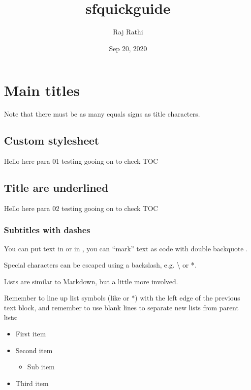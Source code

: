 \documentclass[letterpaper,10pt,english]{sphinxmanual}
\title{sfquickguide}
\date{Sep 20, 2020}
\author{Raj Rathi}
\begin{document}
\pagestyle{empty}
\sphinxmaketitle
\pagestyle{plain}
\sphinxtableofcontents
\pagestyle{normal}
\label{\detokenize{index::doc}}



\chapter{Main titles}
\label{\detokenize{in_file:main-titles}}\label{\detokenize{in_file::doc}}
Note that there must be as many equals signs as title characters.


\section{Custom stylesheet}
\label{\detokenize{in_file:custom-stylesheet}}\label{\detokenize{in_file:id1}}
Hello here para 01 testing gooing on to check TOC


\section{Title are underlined}
\label{\detokenize{in_file:title-are-underlined}}
Hello here para 02 testing gooing on to check TOC


\subsection{Subtitles with dashes}
\label{\detokenize{in_file:subtitles-with-dashes}}
You can put text in  or in , you can “mark” text as code with double backquote .

Special characters can be escaped using a backslash, e.g. \textbackslash{} or *.

Lists are similar to Markdown, but a little more involved.

Remember to line up list symbols (like \sphinxhyphen{} or *) with the left edge of the previous text block, and remember to use blank lines to separate new lists from parent lists:
\begin{itemize}
\item {} 
First item

\item {} 
Second item
\begin{itemize}
\item {} 
Sub item

\end{itemize}

\item {} 
Third item

\end{itemize}
\end{document}
